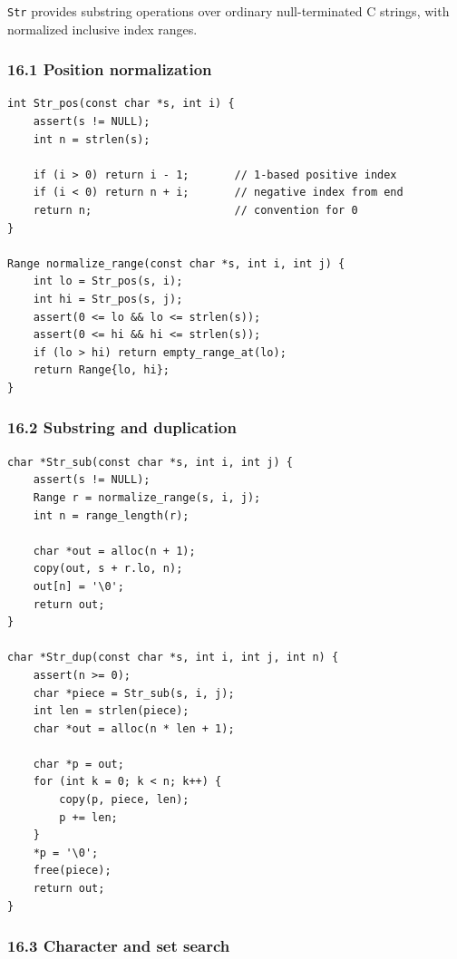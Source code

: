 \documentclass[11pt]{article}
\begin{document}
\texttt{Str} provides substring operations over ordinary null-terminated C strings, with normalized inclusive index ranges.

\subsubsection{16.1 Position normalization}\label{position-normalization}

\begin{verbatim}
int Str_pos(const char *s, int i) {
    assert(s != NULL);
    int n = strlen(s);

    if (i > 0) return i - 1;       // 1-based positive index
    if (i < 0) return n + i;       // negative index from end
    return n;                      // convention for 0
}

Range normalize_range(const char *s, int i, int j) {
    int lo = Str_pos(s, i);
    int hi = Str_pos(s, j);
    assert(0 <= lo && lo <= strlen(s));
    assert(0 <= hi && hi <= strlen(s));
    if (lo > hi) return empty_range_at(lo);
    return Range{lo, hi};
}
\end{verbatim}

\subsubsection{16.2 Substring and duplication}\label{substring-and-duplication}

\begin{verbatim}
char *Str_sub(const char *s, int i, int j) {
    assert(s != NULL);
    Range r = normalize_range(s, i, j);
    int n = range_length(r);

    char *out = alloc(n + 1);
    copy(out, s + r.lo, n);
    out[n] = '\0';
    return out;
}

char *Str_dup(const char *s, int i, int j, int n) {
    assert(n >= 0);
    char *piece = Str_sub(s, i, j);
    int len = strlen(piece);
    char *out = alloc(n * len + 1);

    char *p = out;
    for (int k = 0; k < n; k++) {
        copy(p, piece, len);
        p += len;
    }
    *p = '\0';
    free(piece);
    return out;
}
\end{verbatim}

\subsubsection{16.3 Character and set search}\label{character-and-set-search}
\end{document}
